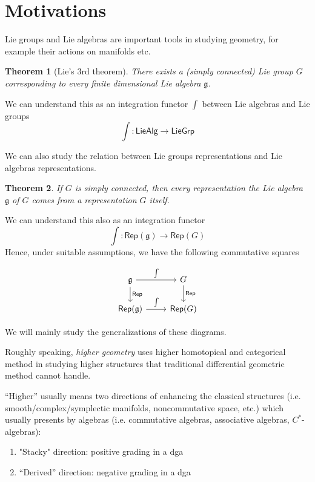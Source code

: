 \documentclass[12pt]{amsart}
\newtheorem{thm}{Theorem}[section]
\theoremstyle{definition}
\theoremstyle{remark}
\numberwithin{equation}{section}
\newcommand{\1}{{\mathbb{1}}}
\newcommand{\g}{\mathfrak{g}}
\newcommand{\rep}{\mathsf{Rep}}
\begin{document}
\section{Motivations}
Lie groups and Lie algebras are important tools in studying geometry, for example their actions on manifolds etc.

    \begin{thm}[Lie's 3rd theorem]
        There exists a (simply connected) Lie group $G$ corresponding to every finite dimensional Lie algebra $\g$.
    \end{thm}
    
    We can understand this as an integration functor $\int$ between Lie algebras and Lie groups
    \begin{equation*}
        \int : \mathsf{LieAlg} \to \mathsf{LieGrp}
    \end{equation*}
    
    We can also study the relation between Lie groups representations and Lie algebras representations.
    \begin{thm}
        If $G$ is simply connected, then every representation the Lie algebra ${\mathfrak {g}}$ of 
$G$ comes from a representation 
$G$ itself.
    \end{thm}
    
    We can understand this also as an integration functor
    \begin{equation*}
        \int: \rep(\g) \to \rep(G)
    \end{equation*}
Hence, under suitable assumptions, we have the following commutative squares
    \begin{center}
    \begin{equation*}
        \begin{tikzcd}[ampersand replacement=\&]
{\g} \arrow[r, "\int"] \arrow[d, "\rep"] \& {G} \arrow[d, "\rep"] \\
{\rep(\g)} \arrow[r, "\int"]                \& {\rep(G)}               
\end{tikzcd}
    \end{equation*}
    \end{center}
    We will mainly study the generalizations of these diagrams.
    
    Roughly speaking, {\it higher geometry} uses higher homotopical and categorical method in studying higher structures that traditional differential geometric method cannot handle.
	
	“Higher” usually means two directions of enhancing the classical structures (i.e. smooth/complex/symplectic manifolds, noncommutative space, etc.) which usually presents by algebras (i.e. commutative algebras, associative algebras, $C^*$-algebras):
	\begin{enumerate}
	    \item "Stacky" direction: positive grading in a dga
	    \item “Derived” direction: negative grading in a dga
	\end{enumerate}
	
\end{document}

